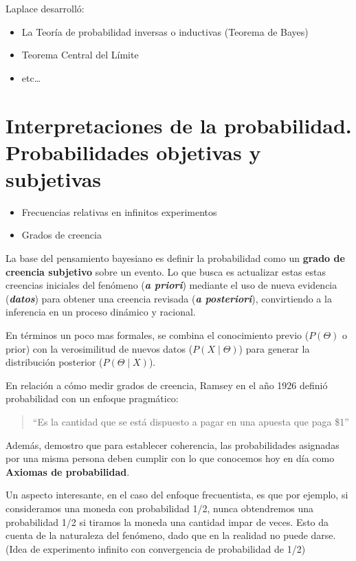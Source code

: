 \documentclass[
  letterpaper,
  DIV=11,
  numbers=noendperiod]{scrreprt}
\providecommand{\tightlist}{%
  \setlength{\itemsep}{0pt}\setlength{\parskip}{0pt}}
\begin{document}
Laplace desarrolló:

\begin{itemize}
\tightlist
\item
  La Teoría de probabilidad inversas o inductivas (Teorema de Bayes)
\item
  Teorema Central del Límite
\item
  etc\ldots{}
\end{itemize}

\section{Interpretaciones de la probabilidad. Probabilidades objetivas y
subjetivas}\label{interpretaciones-de-la-probabilidad.-probabilidades-objetivas-y-subjetivas}

\begin{itemize}
\tightlist
\item
  Frecuencias relativas en infinitos experimentos
\item
  Grados de creencia
\end{itemize}

La base del pensamiento bayesiano es definir la probabilidad como un
\textbf{grado de creencia subjetivo} sobre un evento. Lo que busca es
actualizar estas estas creencias iniciales del fenómeno (\textbf{\emph{a
priori}}) mediante el uso de nueva evidencia (\textbf{\emph{datos}})
para obtener una creencia revisada (\textbf{\emph{a posteriori}}),
convirtiendo a la inferencia en un proceso dinámico y racional.

En términos un poco mas formales, se combina el conocimiento previo
(\(P(\Theta)\) o prior) con la verosimilitud de nuevos datos
(\(P(X \mid \Theta)\)) para generar la distribución posterior
(\(P(\Theta\mid X)\)).

En relación a cómo medir grados de creencia, Ramsey en el año 1926
definió probabilidad con un enfoque pragmático:

\begin{quote}
``Es la cantidad que se está dispuesto a pagar en una apuesta que paga
\$1''
\end{quote}

Además, demostro que para establecer coherencia, las probabilidades
asignadas por una misma persona deben cumplir con lo que conocemos hoy
en día como \textbf{Axiomas de probabilidad}.

Un aspecto interesante, en el caso del enfoque frecuentista, es que por
ejemplo, si consideramos una moneda con probabilidad 1/2, nunca
obtendremos una probabilidad 1/2 si tiramos la moneda una cantidad impar
de veces. Esto da cuenta de la naturaleza del fenómeno, dado que en la
realidad no puede darse. (Idea de experimento infinito con convergencia
de probabilidad de 1/2)
\end{document}
